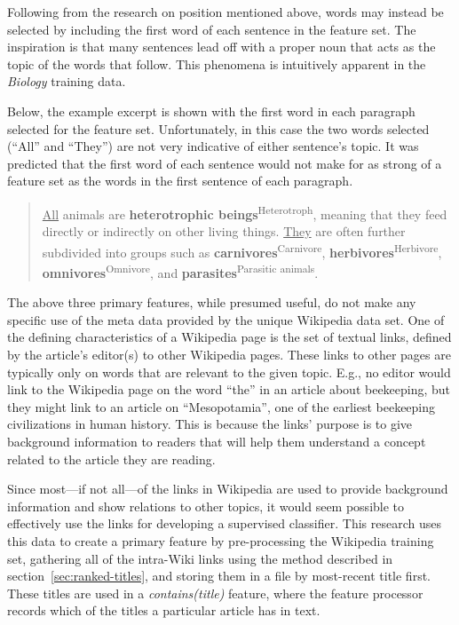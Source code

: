 \label{sec:first-word}

Following from the research on position mentioned above, words may instead be selected by including the first word of each sentence in the feature set.
The inspiration is that many sentences lead off with a proper noun that acts as the topic of the words that follow.
This phenomena is intuitively apparent in the {\it Biology} training data.

Below, the example excerpt is shown with the first word in each paragraph selected for the feature set.
Unfortunately, in this case the two words selected (``All'' and ``They'') are not very indicative of either sentence's topic.
It was predicted that the first word of each sentence would not make for as strong of a feature set as the words in the first sentence of each paragraph.

\begin{quote}
\underline{All} animals are {\bf heterotrophic beings}\textsuperscript{Heterotroph}, meaning that they feed directly or indirectly on other living things. \underline{They} are often further subdivided into groups such as {\bf carnivores}\textsuperscript{Carnivore}, {\bf herbivores}\textsuperscript{Herbivore}, {\bf omnivores}\textsuperscript{Omnivore}, and {\bf parasites}\textsuperscript{Parasitic animals}.
\end{quote}

\label{subsubsubsec:feature-links}

The above three primary features, while presumed useful, do not make any specific use of the meta data provided by the unique Wikipedia data set.
One of the defining characteristics of a Wikipedia page is the set of textual links, defined by the article's editor(s) to other Wikipedia pages.
These links to other pages are typically only on words that are relevant to the given topic.
E.g., no editor would link to the Wikipedia page on the word ``the'' in an article about beekeeping, but they might link to an article on ``Mesopotamia'', one of the earliest beekeeping civilizations in human history.
This is because the links' purpose is to give background information to readers that will help them understand a concept related to the article they are reading.

Since most---if not all---of the links in Wikipedia are used to provide background information and show relations to other topics, it would seem possible to effectively use the links for developing a supervised classifier.
This research uses this data to create a primary feature by pre-processing the Wikipedia training set, gathering all of the intra-Wiki links using the method described in section~\ref{sec:ranked-titles}, and storing them in a file by most-recent title first.
These titles are used in a {\it contains(title)} feature, where the feature processor records which of the titles a particular article has in text.

